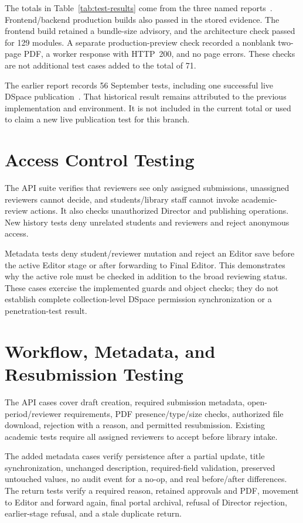 \documentclass[11pt,a4paper]{report}
\begin{document}
The totals in Table~\ref{tab:test-results} come from the three named reports~\cite{api-evidence,email-evidence,browser-evidence}. Frontend/backend production builds also passed in the stored evidence. The frontend build retained a bundle-size advisory, and the architecture check passed for 129 modules. A separate production-preview check recorded a nonblank two-page PDF, a worker response with HTTP~200, and no page errors. These checks are not additional test cases added to the total of 71.

The earlier report records 56 September tests, including one successful live DSpace publication~\cite{previous-report}. That historical result remains attributed to the previous implementation and environment. It is not included in the current total or used to claim a new live publication test for this branch.

\section{Access Control Testing}
The API suite verifies that reviewers see only assigned submissions, unassigned reviewers cannot decide, and students/library staff cannot invoke academic-review actions. It also checks unauthorized Director and publishing operations. New history tests deny unrelated students and reviewers and reject anonymous access.

Metadata tests deny student/reviewer mutation and reject an Editor save before the active Editor stage or after forwarding to Final Editor. This demonstrates why the active role must be checked in addition to the broad reviewing status. These cases exercise the implemented guards and object checks; they do not establish complete collection-level DSpace permission synchronization or a penetration-test result.

\section{Workflow, Metadata, and Resubmission Testing}
The API cases cover draft creation, required submission metadata, open-period/reviewer requirements, PDF presence/type/size checks, authorized file download, rejection with a reason, and permitted resubmission. Existing academic tests require all assigned reviewers to accept before library intake.

The added metadata cases verify persistence after a partial update, title synchronization, unchanged description, required-field validation, preserved untouched values, no audit event for a no-op, and real before/after differences. The return tests verify a required reason, retained approvals and PDF, movement to Editor and forward again, final portal archival, refusal of Director rejection, earlier-stage refusal, and a stale duplicate return.
\end{document}
